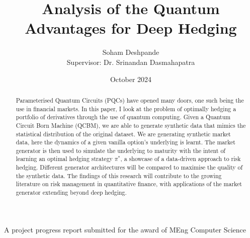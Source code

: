 \documentclass[12pt]{article}
\title{Analysis of the Quantum Advantages for Deep Hedging}
\author{Soham Deshpande\\ Supervisor: Dr. Srinandan Dasmahapatra}
\date{October 2024}
\newcommand{\detailtexcount}[1]{%
  \immediate\write18{texcount -merge #1.tex > #1.wcdetail }%
}
\numberwithin{equation}{section}
\begin{document}
\maketitle
\vspace{10cm}
A project progress report submitted for the award of MEng Computer Science
\thispagestyle{empty}







\clearpage


\begin{abstract}
Parameterised Quantum Circuits (PQCs) have opened many doors, one 
such being the use in financial markets. In this paper, I look at the problem 
of optimally hedging a portfolio of derivatives through the use of quantum computing. 
Given a Quantum Circuit Born Machine (QCBM), we are able to generate synthetic 
data that mimics the statistical distribution of the original dataset. 
We are generating synthetic market data, here the dynamics of a 
given vanilla option's underlying is learnt. The market generator is then used to simulate the 
underlying to maturity with the intent of learning an optimal hedging strategy $\pi^*$, a 
showcase of a data-driven approach to risk hedging. Different generator architectures
will be compared to maximise the quality of the synthetic data. The findings of 
this research will contribute to the growing literature on risk management in 
quantitative finance, with applications of the market generator extending beyond 
deep hedging. 
\end{abstract}

\clearpage


\tableofcontents
\clearpage



\end{document}
